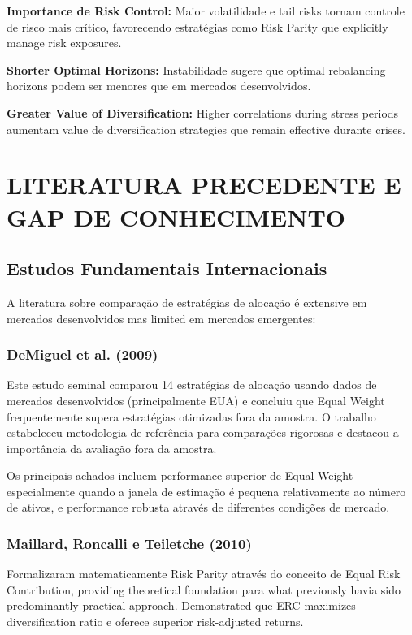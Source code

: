 \textbf{Importance de Risk Control:} Maior volatilidade e tail risks tornam controle de risco mais crítico, favorecendo estratégias como Risk Parity que explicitly manage risk exposures.

\textbf{Shorter Optimal Horizons:} Instabilidade sugere que optimal rebalancing horizons podem ser menores que em mercados desenvolvidos.

\textbf{Greater Value of Diversification:} Higher correlations during stress periods aumentam value de diversification strategies que remain effective durante crises.

\section{LITERATURA PRECEDENTE E GAP DE CONHECIMENTO}

\subsection{Estudos Fundamentais Internacionais}

A literatura sobre comparação de estratégias de alocação é extensive em mercados desenvolvidos mas limited em mercados emergentes:

\subsubsection{DeMiguel et al. (2009)}

Este estudo seminal comparou 14 estratégias de alocação usando dados de mercados desenvolvidos (principalmente EUA) e concluiu que Equal Weight frequentemente supera estratégias otimizadas fora da amostra. O trabalho estabeleceu metodologia de referência para comparações rigorosas e destacou a importância da avaliação fora da amostra.

Os principais achados incluem performance superior de Equal Weight especialmente quando a janela de estimação é pequena relativamente ao número de ativos, e performance robusta através de diferentes condições de mercado.

\subsubsection{Maillard, Roncalli e Teiletche (2010)}

Formalizaram matematicamente Risk Parity através do conceito de Equal Risk Contribution, providing theoretical foundation para what previously havia sido predominantly practical approach. Demonstrated que ERC maximizes diversification ratio e oferece superior risk-adjusted returns.

